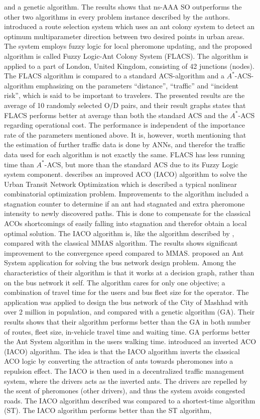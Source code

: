 and a genetic algorithm. The results shows that ns-AAA SO outperforms the other two algorithms in every problem instance described by the authors. \citet{salehinejad10} introduced a route selection system which uses an ant colony system to detect an optimum multiparameter direction between two desired points in urban areas. The system employs fuzzy logic for local pheromone updating, and the proposed algorithm is called Fuzzy Logic-Ant Colony System (FLACS). The algorithm is applied to a part of London, United Kingdom, consisting of 42 junctions (nodes). The FLACS algorithm is compared to a standard ACS-algorithm and a $A^*$-ACS-algorithm emphasizing on the parameters ``distance'', ``traffic'' and ``incident risk'', which is said to be important to travelers. The presented results are the average of 10 randomly selected O/D pairs, and their result graphs states that FLACS performs better at average than both the standard ACS and the $A^*$-ACS regarding operational cost. The performance is independent of the importance rate of the parameters mentioned above. It is, however, worth mentioning that the estimation of further traffic data is done by ANNs, and therefor the traffic data used for each algorithm is not exactly the same. FLACS has less running time than $A^*$-ACS, but more than the standard ACS due to its Fuzzy Logic system component. \citet{jiang10} describes an improved ACO (IACO) algorithm to solve the Urban Transit Network Optimization which is described a typical nonlinear combinatorial optimization problem. Improvements to the algorithm included a stagnation counter to determine if an ant had stagnated and extra pheromone intensity to newly discovered paths. This is done to compensate for the classical ACOs shortcomings of easily falling into stagnation and therefor obtain a local optimal solution. The IACO algorithm is, like the algorithm described by \citet{yang07}, compared with the classical MMAS algorithm. The results shows significant improvement to the convergence speed compared to MMAS.\citet{poorzahedy11} proposed an Ant System application for solving the bus network design problem. Among the characteristics of their algorithm is that it works at a decision graph, rather than on the bus network it self. The algorithm cares for only one objective; a combination of travel time for the users and bus fleet size for the operator. The application was applied to design the bus network of the City of Mashhad with over 2 million in population, and compared with a genetic algorithm (GA). Their results shows that their algorithm performs better than the GA in both number of routes, fleet size, in-vehicle travel time and waiting time. GA performs better the Ant System algorithm in the users walking time. \citet{dias14} introduced an inverted ACO (IACO) algorithm. The idea is that the IACO algorithm inverts the classical ACO logic by converting the attraction of ants towards pheromones into a repulsion effect. The IACO is then used in a decentralized traffic management system, where the drivers acts as the inverted ants. The drivers are repelled by the scent of pheromones (other drivers), and thus the system avoids congested roads. The IACO algorithm described was compared to a shortest-time algorithm (ST). The IACO algorithm performs better than the ST algorithm, 